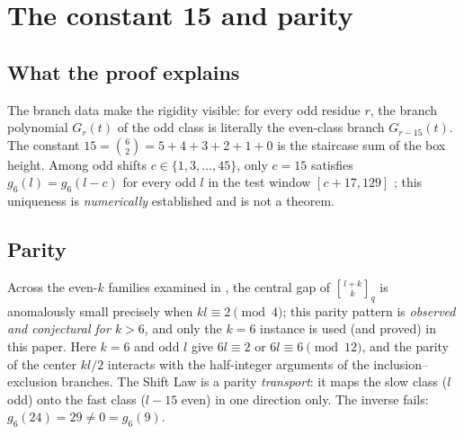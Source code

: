 \documentclass[11pt,reqno]{article}
\theoremstyle{definition}
\newcommand{\ggbrack}[2]{\genfrac{[}{]}{0pt}{}{#1}{#2}_q}
\begin{document}
\section{The constant 15 and parity}\label{sec:why15}
\subsection{What the proof explains}
The branch data make the rigidity visible: for every odd residue $r$, the branch polynomial $G_r(t)$ of the odd class is literally the even-class branch $G_{r-15}(t)$. The constant $15=\binom 62=5+4+3+2+1+0$ is the staircase sum of the box height. Among odd shifts $c\in\{1,3,\dots,45\}$, only $c=15$ satisfies $g_6(l)=g_6(l-c)$ for every odd $l$ in the test window $[c+17,129]$ \cite{M09}; this uniqueness is \emph{numerically} established and is not a theorem.

\subsection{Parity}
Across the even-$k$ families examined in \cite{M08}, the central gap of $\ggbrack{l+k}{k}$ is anomalously small precisely when $kl\equiv2\pmod4$; this parity pattern is \emph{observed and conjectural for $k>6$}, and only the $k=6$ instance is used (and proved) in this paper. Here $k=6$ and odd $l$ give $6l\equiv2$ or $6l\equiv 6\pmod{12}$, and the parity of the center $kl/2$ interacts with the half-integer arguments of the inclusion--exclusion branches. The Shift Law is a parity \emph{transport}: it maps the slow class ($l$ odd) onto the fast class ($l-15$ even) in one direction only. The inverse fails: $g_6(24)=29\ne0=g_6(9)$.
\end{document}
